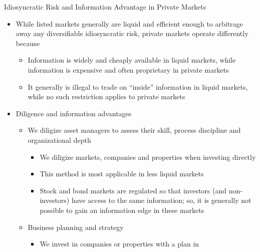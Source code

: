 \documentclass[10pt,english]{beamer}\usepackage[]{graphicx}\usepackage[]{color}
\begin{document}
\begin{frame}{Idiosyncratic Risk and Information Advantage in Private Markets}
\begin{itemize}
\item {\footnotesize{}While listed markets generally are liquid and efficient
enough to arbitrage away any diversifiable idiosyncratic risk, private
markets operate differently because}{\footnotesize \par}
\begin{itemize}
\item {\footnotesize{}Information is widely and cheaply available in liquid
markets, while information is expensive and often proprietary in private
markets}{\footnotesize \par}
\item {\footnotesize{}It generally is illegal to trade on ``inside'' information
in liquid markets, while no such restriction applies to private markets}{\footnotesize \par}
\end{itemize}
\item {\footnotesize{}Diligence and information advantages}{\footnotesize \par}
\begin{itemize}
\item {\footnotesize{}We diligize asset managers to assess their skill,
process discipline and organizational depth}{\footnotesize \par}
\begin{itemize}
\item {\footnotesize{}We diligize markets, companies and properties when
investing directly}{\footnotesize \par}
\item {\footnotesize{}This method is most applicable in less liquid markets}{\footnotesize \par}
\item {\footnotesize{}Stock and bond markets are regulated so that investors
(and non-investors) have access to the same information; so, it is
generally not possible to gain an information edge in these markets}{\footnotesize \par}
\end{itemize}
\item {\footnotesize{}Business planning and strategy}{\footnotesize \par}
\begin{itemize}
\item {\footnotesize{}We invest in companies or properties with a plan in
}
\end{itemize}
\end{itemize}
\end{itemize}
\end{frame}
\end{document}

